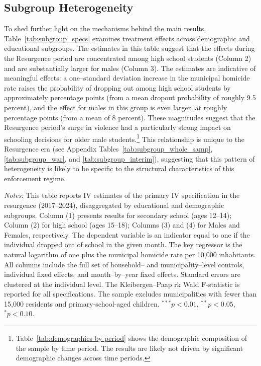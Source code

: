 \documentclass[12pt,letter,english,intoc,bibliography=totoc,index=totoc,BCOR10mm,captions=tableheading,nottitlepage,fleqn]{article}
\theoremstyle{break}
\begin{document}
\subsection*{Subgroup Heterogeneity}
To shed further light on the mechanisms behind the main results, Table~\ref{tab:subgroup_specs} examines treatment effects across demographic and educational subgroups. The estimates in this table suggest that the effects during the Resurgence period are concentrated among high school students (Column 2) and are substantially larger for males (Column 3). The estimates are indicative of meaningful effects: a one--standard deviation increase in the municipal homicide rate raises the probability of dropping out among high school students by approximately {} percentage points (from a mean dropout probability of roughly 9.5 percent), and the effect for males in this group is even larger, at roughly {} percentage points (from a mean of 8 percent). These magnitudes suggest that the Resurgence period's surge in violence had a particularly strong impact on schooling decisions for older male students.\footnote{Table~\ref{tab:demographics by period} shows the demographic composition of the sample by time period. The results are likely not driven by significant demographic changes across time periods.} This relationship is unique to the Resurgence era (see Appendix Tables~\ref{tab:subgroup_whole_samp}, \ref{tab:subgroup_war}, and \ref{tab:subgroup_interim}), suggesting that this pattern of heterogeneity is likely to be specific to the structural characteristics of this enforcement regime. 

\begin{table}[H]
\caption{Subgroup Estimates: Resurgence (2017--2024)}
\label{tab:subgroup_specs}
\centering
\scriptsize 

\vspace{2mm}
\begin{minipage}{0.95\linewidth}
\scriptsize
\textit{Notes:} This table reports IV estimates of the primary IV specification in the resurgence (2017--2024), disaggregated by educational and demographic subgroups. Column (1) presents results for secondary school (ages 12--14); Column (2) for high school (ages 15--18); Columns (3) and (4) for Males and Females, respectively. The dependent variable is an indicator equal to one if the individual dropped out of school in the given month. The key regressor is the natural logarithm of one plus the municipal homicide rate per 10{,}000 inhabitants. All columns include the full set of household-- and municipality--level controls, individual fixed effects, and month--by--year fixed effects. Standard errors are clustered at the individual level. The Kleibergen--Paap rk Wald F-statistic is reported for all specifications. The sample excludes municipalities with fewer than 15{,}000 residents and primary-school-aged children.
 $^{***}p<0.01$, $^{**}p<0.05$, $^{*}p<0.10$.
\end{minipage}
\end{table}
\end{document}

